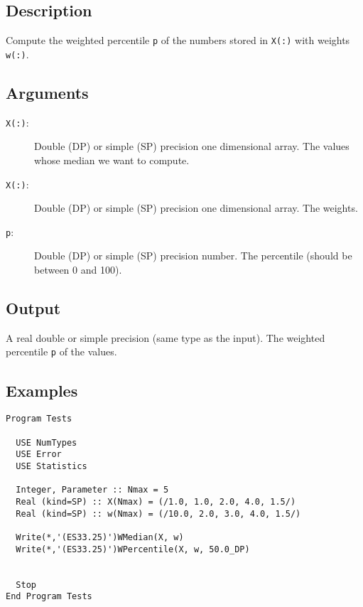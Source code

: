 \subsection{Description}

Compute the weighted percentile \texttt{p} of the numbers stored in
\texttt{X(:)} 
with weights \texttt{w(:)}.

\subsection{Arguments}

\begin{description}
\item[\texttt{X(:)}:] Double (DP) or simple (SP) precision one
  dimensional array. The values  whose median we want to compute.
\item[\texttt{X(:)}:] Double (DP) or simple (SP) precision one
  dimensional array. The weights.
\item[\texttt{p}:] Double (DP) or simple (SP) precision number. The
  percentile (should be between 0 and 100).
\end{description}

\subsection{Output}

A real double or simple precision (same type as the input). The
weighted percentile \texttt{p}
of the values.

\subsection{Examples}

\begin{lstlisting}[emph=WPercentile,
                   emphstyle=\color{blue},
                   frame=trBL,
                   caption=Computing the Weighted Median in two ways.,
                   label=wpercentile]
Program Tests

  USE NumTypes
  USE Error
  USE Statistics

  Integer, Parameter :: Nmax = 5
  Real (kind=SP) :: X(Nmax) = (/1.0, 1.0, 2.0, 4.0, 1.5/)  
  Real (kind=SP) :: w(Nmax) = (/10.0, 2.0, 3.0, 4.0, 1.5/)  

  Write(*,'(ES33.25)')WMedian(X, w)
  Write(*,'(ES33.25)')WPercentile(X, w, 50.0_DP)


  Stop
End Program Tests
\end{lstlisting}

